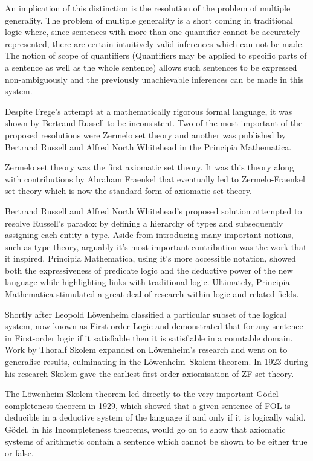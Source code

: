 An implication of this distinction is the resolution of the problem of multiple generality. The problem of multiple generality is a short coming in traditional logic where, since sentences with more than one quantifier cannot be accurately represented,  there are certain intuitively valid inferences which can not be made. The notion of scope of quantifiers (Quantifiers may be applied to specific parts of a sentence as well as the whole sentence) allows such sentences to be expressed non-ambiguously and the previously unachievable inferences can be made in this system.

Despite Frege's attempt at a mathematically rigorous formal language, it was shown by Bertrand Russell to be inconsistent.  Two of the most important of the proposed resolutions were Zermelo set theory and another was published by Bertrand Russell and Alfred North Whitehead in the Principia Mathematica.

Zermelo set theory was the first axiomatic set theory.  It was this theory along with contributions by Abraham Fraenkel that eventually led to Zermelo-Fraenkel set theory which is now the standard form of axiomatic set theory. \cite{cantone2001set}

Bertrand Russell and Alfred North Whitehead's proposed solution attempted to resolve Russell's paradox by defining a hierarchy of types and subsequently assigning each entity a type. Aside from introducing many important notions, such as type theory, arguably it's most important contribution was the work that it inspired. Principia Mathematica, using it's more accessible notation, showed both the expressiveness of predicate logic and the deductive power of the new language while highlighting links with traditional logic. Ultimately, Principia Mathematica stimulated a great deal of research within logic and related fields. \cite{sep-principia-mathematica}

Shortly after Leopold L\"{o}wenheim classified a particular subset of the logical system, now known as First-order Logic and demonstrated that for any sentence in First-order logic if it satisfiable then it is satisﬁable in a countable domain. Work by Thoralf Skolem expanded on L\"{o}wenheim's research and went on to generalise results, culminating in the L\"{o}wenheim–Skolem theorem. In 1923 during his research Skolem gave the earliest first-order axiomisation of ZF set theory.\cite[p.~6]{KingShapiro95}

The L\"{o}wenheim-Skolem theorem led directly to the very important G\"{o}del completeness theorem in 1929, which showed that a given sentence of FOL is deducible in a deductive system of the language if and only if it is logically valid.  G\"{o}del, in his Incompleteness theorems,  would go on to show that axiomatic systems of arithmetic contain a sentence which cannot be shown to be either true or false. \cite{ KingShapiro95} 

